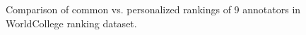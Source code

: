 \documentclass[10pt,journal,cspaper,compsoc]{IEEEtran}
\begin{document}
{\begin{figure}
 \begin{center}
 \caption{Comparison of common vs. personalized rankings of 9 annotators in WorldCollege ranking dataset.} \label{university_position_color}
\end{center}
\end{figure}




}
\end{document}
